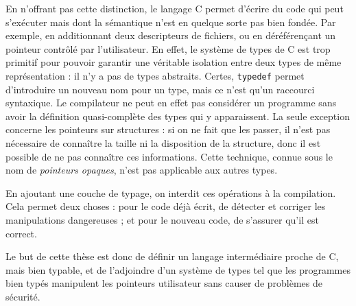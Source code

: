 En n'offrant pas cette distinction, le langage C permet d'écrire du code qui
peut s'exécuter mais dont la sémantique n'est en quelque sorte pas bien fondée.
Par exemple, en additionnant deux descripteurs de fichiers, ou en déréférençant
un pointeur contrôlé par l'utilisateur. En effet, le système de types de C est
trop primitif pour pouvoir garantir une véritable isolation entre deux types de
même représentation : il n'y a pas de types abstraits. Certes, \texttt{typedef}
permet d'introduire un nouveau nom pour un type, mais ce n'est qu'un raccourci
syntaxique. Le compilateur ne peut en effet pas considérer un programme sans
avoir la définition quasi-complète des types qui y apparaissent. La seule
exception concerne les pointeurs sur structures : si on ne fait que les passer,
il n'est pas nécessaire de connaître la taille ni la disposition de la
structure, donc il est possible de ne pas connaître ces informations. Cette
technique, connue sous le nom de \emph{pointeurs opaques}, n'est pas applicable
aux autres types.

En ajoutant une couche de typage, on interdit ces opérations à la compilation.
Cela permet deux choses : pour le code déjà écrit, de détecter et corriger les
manipulations dangereuses ; et pour le nouveau code, de s'assurer qu'il est
correct.

Le but de cette thèse est donc de définir un langage intermédiaire proche de C,
mais bien typable, et de l'adjoindre d'un système de types tel que les
programmes bien typés manipulent les pointeurs utilisateur sans causer de
problèmes de sécurité.

